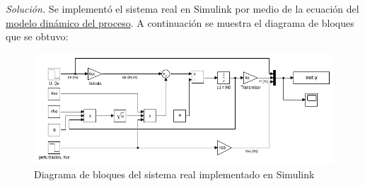
\textit{Solución.} Se implementó el sistema real en Simulink por medio de la ecuación del \hyperref[eq1]{modelo dinámico del proceso}. A continuación se muestra el diagrama de bloques que se obtuvo:

\begin{figure}[!h]
    \centering
    \includegraphics[width = 0.8\linewidth]{figs/fig2.png}
    \caption{Diagrama de bloques del sistema real implementado en Simulink}
    \label{fig2}
\end{figure}

